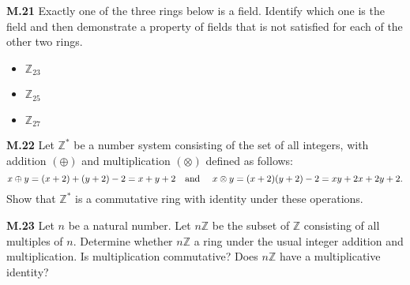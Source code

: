 \documentclass[addpoints]{exam}
\begin{document}
\begin{questions}


\question \textbf{M.21}
Exactly one of the three rings below is a field. Identify which one is the field and then demonstrate a property of fields that is not satisfied for each of the other two rings.
\begin{itemize}
\item $\mathbb{Z}_{23}$
\item $\mathbb{Z}_{25}$
\item $\mathbb{Z}_{27}$
\end{itemize}


\question \textbf{M.22}
Let $\mathbb{Z}^*$ be a number system consisting of the set of all integers, with addition $(\oplus)$ and multiplication $(\otimes)$ defined as follows:
\[
x\oplus y=(x+2)+(y+2)-2= x+y+2\text{\quad and \quad}x\otimes y=(x+2)(y+2)-2=xy+2x+2y+2.
\]
Show that $\mathbb{Z}^*$ is a commutative ring with identity under these operations.

\question \textbf{M.23}
Let $n$ be a natural number. Let $n\mathbb{Z}$ be the subset of $\mathbb{Z}$ consisting of all multiples of $n$. Determine whether  $n\mathbb{Z}$ a ring under the usual integer addition and multiplication. Is multiplication commutative? Does $n\mathbb{Z}$ have a multiplicative identity?







\end{questions}
\end{document}
